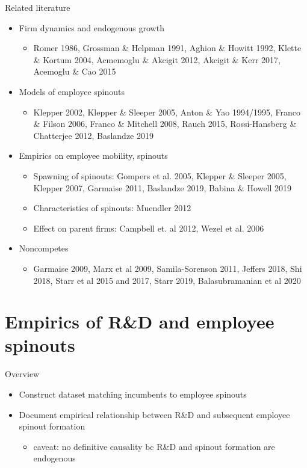 \documentclass[english,usenames,dvipsnames]{beamer}
\begin{document}
\begin{frame}{Related literature}
\begin{itemize}
\small
\item Firm dynamics and endogenous growth
\begin{itemize}
\item Romer 1986, Grossman \& Helpman 1991, Aghion \& Howitt 1992, Klette \& Kortum 2004, Acmemoglu \& Akcigit 2012, Akcigit \& Kerr 2017, Acemoglu \& Cao 2015
\end{itemize}
\smallskip
\item Models of employee spinouts
\begin{itemize}
\item Klepper 2002, Klepper \& Sleeper 2005, Anton \& Yao 1994/1995, Franco \& Filson 2006, Franco \& Mitchell 2008, Rauch 2015, Rossi-Hansberg \& Chatterjee 2012, Baslandze 2019
\end{itemize}
\smallskip
\item Empirics on employee mobility, spinouts
\begin{itemize}
\item Spawning of spinouts: Gompers et al. 2005, Klepper \& Sleeper 2005, Klepper 2007, Garmaise 2011, Baslandze 2019, Babina \& Howell 2019
\item Characteristics of spinouts: Muendler 2012
\item Effect on parent firms: Campbell et. al 2012, Wezel et al. 2006
\end{itemize}
\smallskip
\item Noncompetes
\begin{itemize}
	\item Garmaise 2009, Marx et al 2009, Samila-Sorenson 2011, Jeffers 2018, Shi 2018, Starr et al 2015 and 2017, Starr 2019, Balasubramanian et al 2020
\end{itemize}
\end{itemize}
\end{frame}

\section{Empirics of R\&D and employee spinouts}

\begin{frame}
	\tableofcontents[currentsection]
\end{frame}

\begin{frame}{Overview}
	\begin{itemize}
		\item Construct dataset matching incumbents to employee spinouts
		\smallskip
		\item Document empirical relationship between R\&D and subsequent employee spinout formation
		\begin{itemize}
			\item caveat: no definitive causality bc R\&D and spinout formation are endogenous 
		\end{itemize}
	\end{itemize}
\end{frame}
\end{document}
